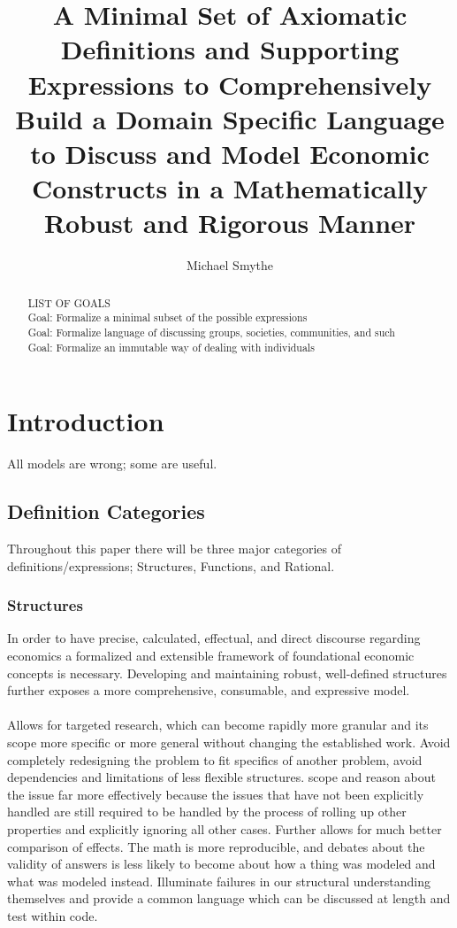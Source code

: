 \documentclass[]{article}
\title{A Minimal Set of Axiomatic Definitions and Supporting Expressions to Comprehensively Build a Domain Specific Language to Discuss and Model Economic Constructs in a Mathematically Robust and Rigorous Manner}
\author{Michael Smythe}
\begin{document}
\maketitle

\begin{abstract}
LIST OF GOALS
\\Goal: Formalize a minimal subset of the possible expressions
\\Goal: Formalize language of discussing groups, societies, communities, and such
\\Goal: Formalize an immutable way of dealing with individuals
\end{abstract}
\section*{Introduction}
All models are wrong; some are useful. 
\subsection*{Definition Categories}
Throughout this paper there will be three major categories of definitions/expressions; Structures, Functions, and Rational.
%
\subsubsection*{Structures}
In order to have precise, calculated, effectual, and direct discourse regarding economics a formalized and extensible framework of foundational economic concepts is necessary. Developing and maintaining robust, well-defined structures further exposes a more comprehensive, consumable, and expressive model. 
\\
\\
Allows for targeted research, which can become rapidly more granular and its scope more specific or more general without changing the established work. Avoid completely redesigning the problem to fit specifics of another problem, avoid dependencies and limitations of less flexible structures. scope and reason about the issue far more effectively because the issues that have not been explicitly handled are still required to be handled by the process of rolling up other properties and explicitly ignoring all other cases. Further allows for much better comparison of effects. The math is more reproducible, and debates about the validity of answers is less likely to become about how a thing was modeled and what was modeled instead. Illuminate failures in our structural understanding themselves and provide a common language which can be discussed at length and test within code.  
\end{document}
